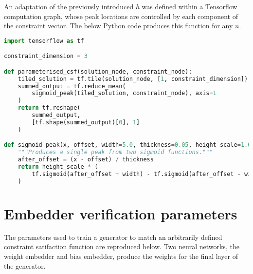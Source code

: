 \documentclass[../main.tex]{subfiles}
\begin{document}
An adaptation of the previously introduced $h$ was defined within a Tensorflow computation graph, whose peak locations are controlled by each component of the constraint vector.
The below Python code produces this function for any $n$.
\begin{lstlisting}[language=python,firstnumber=1,caption={Python code to produce a constraint satisfaction function parameterised by a constraint vector within a Tensorflow computation graph.},captionpos=b]
import tensorflow as tf

constraint_dimension = 3

def parameterised_csf(solution_node, constraint_node):
    tiled_solution = tf.tile(solution_node, [1, constraint_dimension])
    summed_output = tf.reduce_mean(
        sigmoid_peak(tiled_solution, constraint_node), axis=1
    )
    return tf.reshape(
        summed_output,
        [tf.shape(summed_output)[0], 1]
    )

def sigmoid_peak(x, offset, width=5.0, thickness=0.05, height_scale=1.0):
    """Produces a single peak from two sigmoid functions."""
    after_offset = (x - offset) / thickness
    return height_scale * (
        tf.sigmoid(after_offset + width) - tf.sigmoid(after_offset - width)
    )
\end{lstlisting}

\section{Embedder verification parameters} \label{appendix:embedderVerificationParameters}

The parameters used to train a generator to match an arbitrarily defined constraint satifaction function are reproduced below.
Two neural networks, the weight embedder and bias embedder, produce the weights for the final layer of the generator.
\end{document}
